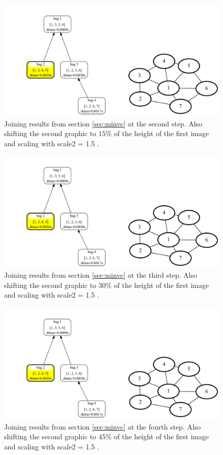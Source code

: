 \documentclass[a4paper, 12pt, bibliography=totoc]{scrartcl}
\begin{document}
\begin{figure}
	\centering
	\includegraphics[width=0.9\linewidth,height=0.9\textheight,keepaspectratio]{images/SVGJOIN/default_06sc15_rise1.pdf}
	\caption{Joining results from section \ref{sec:minvc} at the second step. Also shifting the second graphic to $15\%$ of the height of the first image and scaling with scale2 = 1.5 .}
	\label{fig:joinscaledrise2}
\end{figure}
\begin{figure}
	\centering
	\includegraphics[width=0.9\linewidth,height=0.9\textheight,keepaspectratio]{images/SVGJOIN/default_06sc15_rise1.pdf}
	\caption{Joining results from section \ref{sec:minvc} at the third step. Also shifting the second graphic to $30\%$ of the height of the first image and scaling with scale2 = 1.5 .}
	\label{fig:joinscaledrise3}
\end{figure}
\begin{figure}
	\centering
	\includegraphics[width=0.9\linewidth,height=0.9\textheight,keepaspectratio]{images/SVGJOIN/default_06sc15_rise1.pdf}
	\caption{Joining results from section \ref{sec:minvc} at the fourth step. Also shifting the second graphic to $45\%$ of the height of the first image and scaling with scale2 = 1.5 .}
	\label{fig:joinscaledrise4}
\end{figure}
\end{document}
